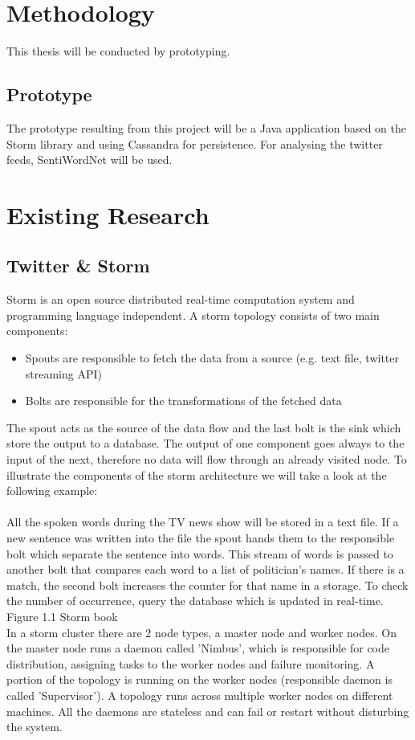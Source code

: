 \documentclass[a4paper]{article}
\begin{document}
\section{Methodology}
This thesis will be conducted by prototyping. 
\subsection{Prototype}
The prototype resulting from this project will be a Java application based on the Storm library and using Cassandra for persistence. For analysing the twitter feeds, SentiWordNet will be used. 

\section{Existing Research}
\subsection{Twitter \& Storm}
Storm is an open source distributed real-time computation system and programming language independent. A storm topology consists of two main components:
\begin{itemize}
	\item Spouts are responsible to fetch the data from a source (e.g. text file, twitter streaming API)
	\item Bolts are responsible for the transformations of the fetched data
\end{itemize}
The spout acts as the source of the data flow and the last bolt is the sink which store the output to a database. The output of one component goes always to the input of the next, therefore no data will flow through an already visited node. To illustrate the components of the storm architecture we will take a look at the following example:\\\\
All the spoken words during the TV news show will be stored in a text file. If a new sentence was written into the file the spout hands them to the responsible bolt which separate the sentence into words. This stream of words is passed to another bolt that compares each word to a list of politician's names. If there is a match, the second bolt increases the counter for that name in a storage. To check the number of occurrence, query the database which is updated in real-time.\\
Figure 1.1 Storm book\\
In a storm cluster there are 2 node types, a master node and worker nodes. On the master node runs a daemon called 'Nimbus', which is responsible for code distribution, assigning tasks to the worker nodes and failure monitoring. A portion of the topology is running on the worker nodes (responsible daemon is called 'Supervisor'). A topology runs across multiple worker nodes on different machines. All the daemons are stateless and can fail or restart without disturbing the system.\\
\end{document}
